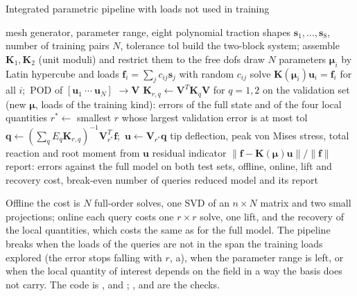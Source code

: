 \begin{algbox}{Integrated parametric pipeline with loads not used in training}
\begin{pseudo}
\Require mesh generator, parameter range, eight polynomial traction shapes $\bm s_1,\dots,\bm s_8$, number of training pairs $N$, tolerance tol
\State build the two-block system; assemble $\bm K_1,\bm K_2$ (unit moduli) and restrict them to the free dofs
\State draw $N$ parameters $\bm\mu_i$ by Latin hypercube and loads $\bm f_i=\sum_j c_{ij}\bm s_j$ with random $c_{ij}$
\State solve $\bm K(\bm\mu_i)\bm u_i=\bm f_i$ for all $i$;\ POD of $[\bm u_1\ \cdots\ \bm u_N]$ $\to\bm V$ 
\State $\bm K_{r,q}\gets\bm V^T\bm K_q\bm V$ for $q=1,2$ 
  \State on the validation set (new $\bm\mu$, loads of the training kind): errors of the full state and of the four local quantities
\EndFor
\State $r^\ast\gets$ smallest $r$ whose largest validation error is at most tol
  \State $\bm q\gets(\sum_qE_q\bm K_{r,q})^{-1}\bm V_{r^\ast}^T\bm f$;\ $\bm u\gets\bm V_{r^\ast}\bm q$ 
  \State tip deflection, peak von Mises stress, total reaction and root moment from $\bm u$ 
  \State residual indicator $\|\bm f-\bm K(\bm\mu)\bm u\|/\|\bm f\|$
\EndFor
\State report: errors against the full model on both test sets, offline, online, lift and recovery cost, break-even number of queries
\Ensure reduced model and its report
\end{pseudo}
\end{algbox}

Offline the cost is $N$ full-order solves, one SVD of an $n\times N$ matrix and two small projections; online each query costs one $r\times r$ solve, one lift, and the recovery of the local quantities, which costs the same as for the full model. The pipeline breaks when the loads of the queries are not in the span the training loads explored (the error stops falling with $r$, a), when the parameter range is left, or when the local quantity of interest depends on the field in a way the basis does not carry. The code is ,  and ; ,  and  are the checks.

